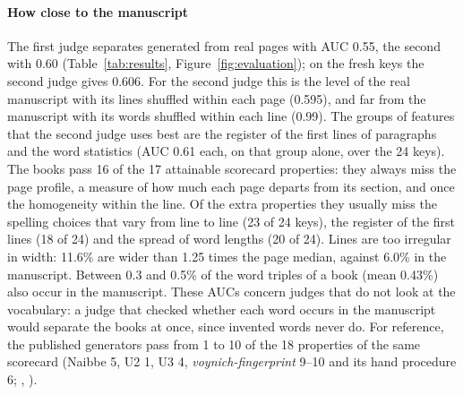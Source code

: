 \paragraph{How close to the manuscript} The first judge separates generated from real pages with AUC 0.55, the second
with 0.60 (Table~\ref{tab:results}, Figure~\ref{fig:evaluation}); on the fresh keys the second judge gives 0.606. For the
second judge this is the level of the real manuscript with its lines shuffled within each page (0.595), and far from
the manuscript with its words shuffled within each line (0.99). The groups of features that the second judge uses best
are the register of the first lines of paragraphs and the word statistics (AUC 0.61 each, on that group alone, over the
24 keys). The books pass 16 of the 17
attainable scorecard properties: they always miss the page profile, a measure of how much each page departs from its
section, and once the homogeneity within the line. Of the extra properties they usually miss the spelling choices that
vary from line to line (23 of 24 keys), the register of the first lines (18 of 24) and the spread of word lengths (20 of
24). Lines are too irregular in width: 11.6\% are wider than 1.25 times the page median, against 6.0\% in the
manuscript. Between 0.3 and 0.5\% of the word triples of a book (mean 0.43\%) also occur in the manuscript.
These AUCs concern judges that do not look at the vocabulary: a judge that checked whether each word occurs in the
manuscript would separate the books at once, since invented words never do. For reference, the published generators
pass from 1 to 10 of the 18 properties of the same scorecard (Naibbe 5, U2 1, U3 4, \emph{voynich-fingerprint} 9--10
and its hand procedure 6; , ).

